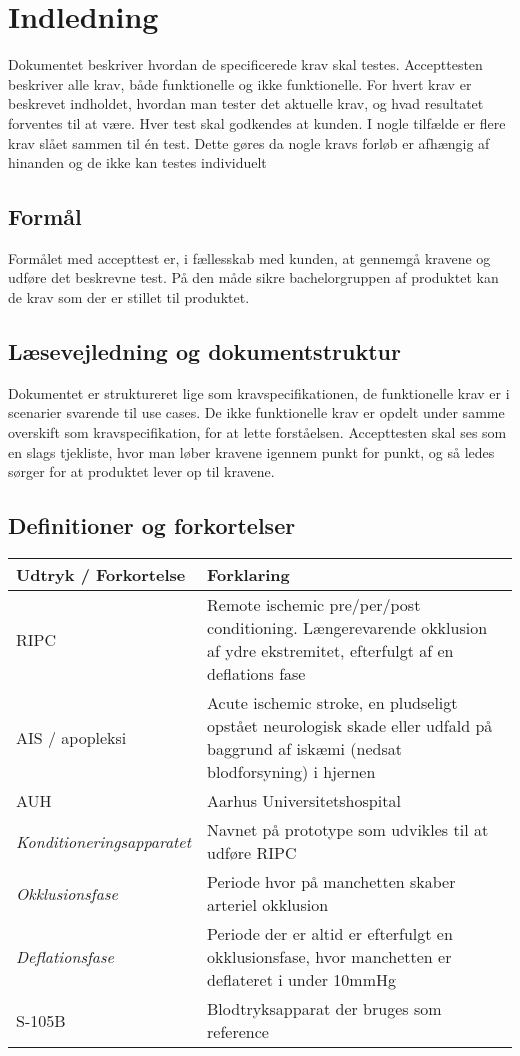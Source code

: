 	\chapter{Indledning}
	Dokumentet beskriver hvordan de specificerede krav skal testes. Accepttesten beskriver alle krav, både funktionelle og ikke funktionelle. For hvert krav er beskrevet indholdet, hvordan man tester det aktuelle krav, og hvad resultatet forventes til at være. Hver test skal godkendes at kunden. 
	I nogle tilfælde er flere krav slået sammen til én test. Dette gøres da nogle kravs forløb er afhængig af hinanden og de ikke kan testes individuelt 
	
	\section{Formål}
	Formålet med accepttest er, i fællesskab med kunden, at gennemgå kravene og udføre det beskrevne test. På den måde sikre bachelorgruppen af produktet kan de krav som der er stillet til produktet. 
	
	\section{Læsevejledning og dokumentstruktur}
	Dokumentet er struktureret lige som kravspecifikationen, de funktionelle krav er i scenarier svarende til use cases. De ikke funktionelle krav er opdelt under samme overskift som kravspecifikation, for at lette forståelsen. 
	Accepttesten skal ses som en slags tjekliste, hvor man løber kravene igennem punkt for punkt, og så ledes sørger for at produktet lever op til kravene. 
	
	\newpage
	\section{Definitioner og forkortelser}
	\begin{longtable}{ |p{} |p{}| } 
		\hline
		\rowcolor{usDef}
		\textbf{Udtryk / Forkortelse} &  \textbf{Forklaring} \\
		\hline
		RIPC & Remote ischemic pre/per/post conditioning. Længerevarende okklusion af ydre ekstremitet, efterfulgt af en deflations fase\\
		\hline
		AIS / apopleksi & Acute ischemic stroke, en pludseligt opstået neurologisk skade eller udfald på baggrund af iskæmi (nedsat blodforsyning) i hjernen \\
		\hline
		AUH & Aarhus Universitetshospital \\
		\hline
		\textit{Konditioneringsapparatet} & Navnet på prototype som udvikles til at udføre RIPC \\
		\hline
		\textit{Okklusionsfase} & Periode hvor på manchetten skaber arteriel okklusion \\
		\hline
		\textit{Deflationsfase} & Periode der er altid er efterfulgt en okklusionsfase, hvor manchetten er deflateret i under 10mmHg\\
		\hline
		S-105B & Blodtryksapparat der bruges som reference \\
		\hline
	\end{longtable}
